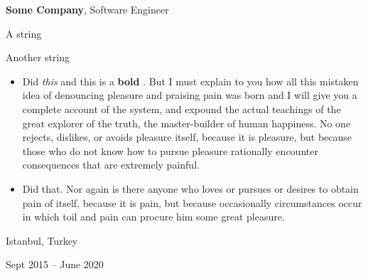 \documentclass[10pt, letterpaper]{article}
\newenvironment{summary}{
    \begin{description}[
        topsep=0.10 cm,
        parsep=0.10 cm,
        partopsep=0pt,
        itemsep=0pt,
        leftmargin=0.4 cm + 10pt
    ]
}{
    \end{description}
} %
\newenvironment{highlights}{
    \begin{itemize}[
        topsep=0.10 cm,
        parsep=0.10 cm,
        partopsep=0pt,
        itemsep=0pt,
        leftmargin=0.4 cm + 10pt
    ]
}{
    \end{itemize}
} %
\newenvironment{twocolentry}[2][]{
    \onecolentry
    \def\secondColumn{#2}
    \setcolumnwidth{\fill, 4.5 cm}
    \begin{paracol}{2}
}{
    \switchcolumn \raggedleft \secondColumn
    \end{paracol}
    \endonecolentry
} %
\let\hrefWithoutArrow\href
\renewcommand{\href}[2]{\hrefWithoutArrow{#1}{\ifthenelse{\equal{#2}{}}{ }{#2 }\raisebox{.15ex}{\footnotesize \faExternalLink*}}}
\begin{document}
        \begin{twocolentry}{
            Istanbul, Turkey

        Sept 2015 – June 2020
        }
            \textbf{Some \textnormal{Company}}, Software Engineer
            \begin{summary}
                \item A string
                \item Another string
            \end{summary}
            \begin{highlights}
                \item Did \textit{this} and this is a \textbf{bold} \href{https://example.com}{link}. But I must explain to you how all this mistaken idea of denouncing pleasure and praising pain was born and I will give you a complete account of the system, and expound the actual teachings of the great explorer of the truth, the master-builder of human happiness. No one rejects, dislikes, or avoids pleasure itself, because it is pleasure, but because those who do not know how to pursue pleasure rationally encounter consequences that are extremely painful.
                \item Did that. Nor again is there anyone who loves or pursues or desires to obtain pain of itself, because it is pain, but because occasionally circumstances occur in which toil and pain can procure him some great pleasure.
            \end{highlights}
        \end{twocolentry}


        \vspace{0.2 cm}
\end{document}
